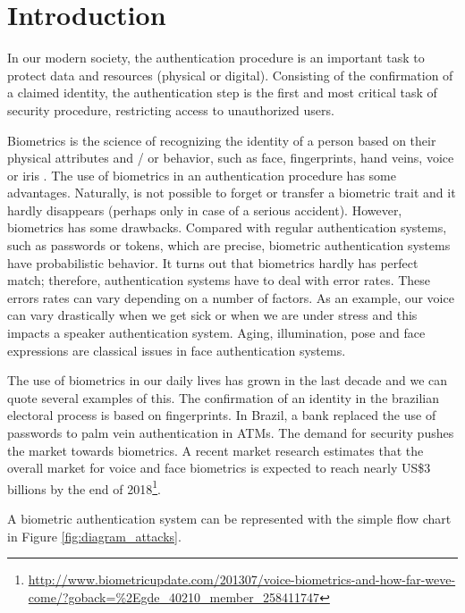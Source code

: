\chapter{Introduction}
\label{chap:introduction}

In our modern society, the authentication procedure is an important task to protect data and resources (physical or digital). Consisting of the confirmation of a claimed identity, the authentication step is the first and most critical task of security procedure, restricting access to unauthorized users. 

Biometrics is the science of recognizing the identity of a person based on their physical attributes and / or behavior, such as face, fingerprints, hand veins, voice or iris \citep{li2011handbook}. The use of biometrics in an authentication procedure has some advantages. Naturally, is not possible to forget or transfer a biometric trait and it hardly disappears (perhaps only in case of a serious accident). However, biometrics has some drawbacks. Compared with regular authentication systems, such as passwords or tokens, which are precise, biometric authentication systems have probabilistic behavior. It turns out that biometrics hardly has perfect match; therefore, authentication systems have to deal with error rates. These errors rates can vary depending on a number of factors. As an example, our voice can vary drastically  when we get sick or when we are under stress and this impacts a speaker authentication system. Aging, illumination, pose and face expressions are classical issues in face authentication systems.


The use of biometrics in our daily lives has grown in the last decade and we can quote several examples of this. The confirmation of an identity in the brazilian electoral process is based on fingerprints. In Brazil, a bank replaced the use of passwords to palm vein authentication in ATMs. The demand for security pushes the market towards biometrics. A recent market research estimates that the overall market for voice and face biometrics is expected to reach nearly US\$3 billions by the end of 2018\footnote{\url{http://www.biometricupdate.com/201307/voice-biometrics-and-how-far-weve-come/?goback=\%2Egde\_40210\_member\_258411747}}.


A biometric authentication system can be represented with the simple flow chart in Figure \ref{fig:diagram_attacks}.

